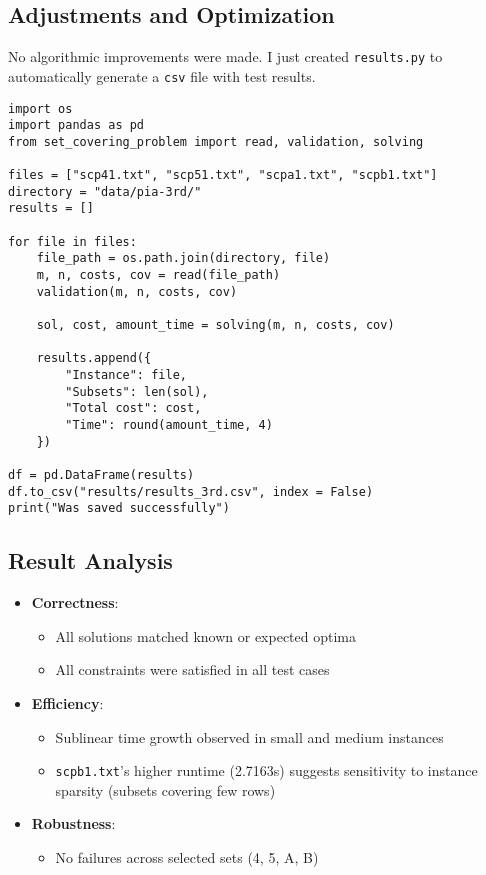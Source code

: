 \documentclass[12pt]{article}
\begin{document}
\subsection{Adjustments and Optimization}
No algorithmic improvements were made. I just created \texttt{results.py} to automatically generate a \texttt{csv} file with test results.

\begin{verbatim}
import os
import pandas as pd
from set_covering_problem import read, validation, solving

files = ["scp41.txt", "scp51.txt", "scpa1.txt", "scpb1.txt"]
directory = "data/pia-3rd/"
results = []

for file in files:
    file_path = os.path.join(directory, file)
    m, n, costs, cov = read(file_path)
    validation(m, n, costs, cov)
    
    sol, cost, amount_time = solving(m, n, costs, cov)
    
    results.append({
        "Instance": file,
        "Subsets": len(sol),
        "Total cost": cost,
        "Time": round(amount_time, 4)
    })

df = pd.DataFrame(results)
df.to_csv("results/results_3rd.csv", index = False)
print("Was saved successfully")
\end{verbatim}

\subsection{Result Analysis}

\begin{itemize}
    \item \textbf{Correctness}:
    \begin{itemize}
        \item All solutions matched known or expected optima
        \item All constraints were satisfied in all test cases
    \end{itemize}
    
    \item \textbf{Efficiency}:
    \begin{itemize}
        \item Sublinear time growth observed in small and medium instances
        \item \texttt{scpb1.txt}'s higher runtime (2.7163s) suggests sensitivity to instance sparsity (subsets covering few rows)
    \end{itemize}
    
    \item \textbf{Robustness}:
    \begin{itemize}
        \item No failures across selected sets (4, 5, A, B)
    \end{itemize}
\end{itemize}
\end{document}
